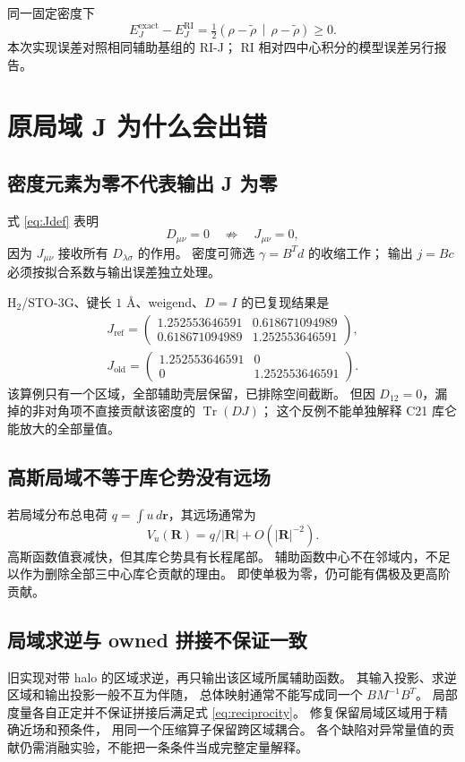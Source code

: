 \documentclass[UTF8,fontset=fandol,11pt,a4paper]{ctexart}
\numberwithin{equation}{section}
\newcommand{\Tr}{\operatorname{Tr}}
\newcommand{\inner}[2]{\left(#1\,\middle|\,#2\right)}
\begin{document}
同一固定密度下
\begin{equation}
E_J^{\mathrm{exact}}-E_J^{\mathrm{RI}}
=\tfrac12\inner{\rho-\widetilde\rho}{\rho-\widetilde\rho}\geq0.
\end{equation}
本次实现误差对照相同辅助基组的 RI-J；
RI 相对四中心积分的模型误差另行报告。

\section{原局域 J 为什么会出错}
\label{sec:bugs}
\subsection{密度元素为零不代表输出 J 为零}
式 \eqref{eq:Jdef} 表明
\begin{equation}
D_{\mu\nu}=0\quad\not\Longrightarrow\quad J_{\mu\nu}=0,
\end{equation}
因为 \(J_{\mu\nu}\) 接收所有 \(D_{\lambda\sigma}\) 的作用。
密度可筛选 \(\gamma=B^Td\) 的收缩工作；
输出 \(j=Bc\) 必须按拟合系数与输出误差独立处理。

H$_2$/STO-3G、键长 \(1\) \AA、weigend、\(D=I\) 的已复现结果是
\begin{align}
J_{\mathrm{ref}}=
\begin{pmatrix}1.252553646591&0.618671094989\\
0.618671094989&1.252553646591\end{pmatrix},\\
J_{\mathrm{old}}=
\begin{pmatrix}1.252553646591&0\\0&1.252553646591\end{pmatrix}.
\end{align}
该算例只有一个区域，全部辅助壳层保留，已排除空间截断。
但因 \(D_{12}=0\)，漏掉的非对角项不直接贡献该密度的 \(\Tr(DJ)\)；
这个反例不能单独解释 C21 库仑能放大的全部量值。

\subsection{高斯局域不等于库仑势没有远场}
若局域分布总电荷 \(q=\int u\,d\bm r\)，其远场通常为
\begin{equation}
V_u(\bm R)=q/|\bm R|+O(|\bm R|^{-2}).
\end{equation}
高斯函数值衰减快，但其库仑势具有长程尾部。
辅助函数中心不在邻域内，不足以作为删除全部三中心库仑贡献的理由。
即使单极为零，仍可能有偶极及更高阶贡献。

\subsection{局域求逆与 owned 拼接不保证一致}
旧实现对带 halo 的区域求逆，再只输出该区域所属辅助函数。
其输入投影、求逆区域和输出投影一般不互为伴随，
总体映射通常不能写成同一个 \(BM^{-1}B^T\)。
局部度量各自正定并不保证拼接后满足式 \eqref{eq:reciprocity}。
修复保留局域区域用于精确近场和预条件，
用同一个压缩算子保留跨区域耦合。
各个缺陷对异常量值的贡献仍需消融实验，不能把一条条件当成完整定量解释。
\end{document}
